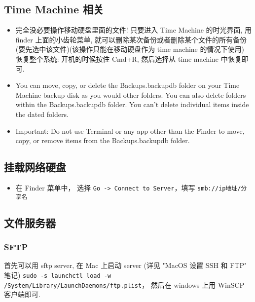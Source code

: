 \subsection{Time Machine 相关}
\begin{itemize}
\item 完全没必要操作移动硬盘里面的文件! 只要进入 Time Machine 的时光界面, 用 finder 上面的小齿轮菜单, 就可以删除某次备份或者删除某个文件的所有备份 (要先选中该文件)(该操作只能在移动硬盘作为 time machine 的情况下使用)
恢复整个系统: 开机的时候按住 Cmd+R, 然后选择从 time machine 中恢复即可.
\item You can move, copy, or delete the Backups.backupdb folder on your Time Machine backup disk as you would other folders. You can also delete folders within the Backups.backupdb folder. You can’t delete individual items inside the dated folders.
\item Important: Do not use Terminal or any app other than the Finder to move, copy, or remove items from the Backups.backupdb folder.
\end{itemize}

\subsection{挂载网络硬盘}
\begin{itemize}
\item 在 Finder 菜单中， 选择 \verb`Go -> Connect to Server`，填写 \verb`smb://ip地址/分享名`
\end{itemize}

\subsection{文件服务器}
\subsubsection{SFTP}
首先可以用 sftp server, 在 Mac 上启动 server (详见 "MacOS 设置 SSH 和 FTP" 笔记)
\verb|sudo -s launchctl load -w /System/Library/LaunchDaemons/ftp.plist|， 然后在 windows 上用 WinSCP 客户端即可.

